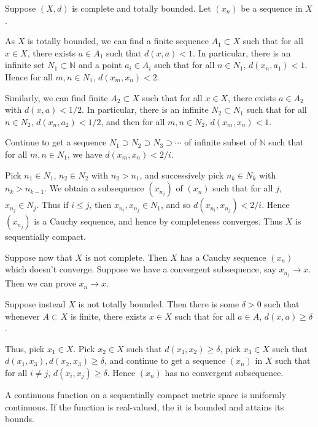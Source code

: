 \documentclass[12pt]{article}
\begin{document}
\begin{proofbox}
	Suppose $(X, d)$ is complete and totally bounded. Let $(x_n)$ be a sequence in $X$.

	As $X$ is totally bounded, we can find a finite sequence $A_1 \subset X$ such that for all $x \in X$, there exists $a \in A_1$ such that $d(x, a) < 1$. In particular, there is an infinite set $N_1 \subset \mathbb{N}$ and a point $a_i \in A_i$ such that for all $n \in N_1$, $d(x_n, a_1) < 1$. Hence for all $m, n \in N_1$, $d(x_m, x_n) < 2$.

	Similarly, we can find finite $A_2 \subset X$ such that for all $x \in X$, there exists $a \in A_2$ with $d(x, a) < 1/2$. In particular, there is an infinite $N_2 \subset N_1$ such that for all $n \in N_2$, $d(x_n, a_2) < 1/2$, and then for all $m, n \in N_2$, $d(x_m, x_n) < 1$.

	Continue to get a sequence $N_1 \supset N_2 \supset N_3 \supset \cdots$ of infinite subset of $\mathbb{N}$ such that for all $m, n \in N_1$, we have $d(x_m, x_n) < 2/i$.
	
	Pick $n_1 \in N_1$, $n_2 \in N_2$ with $n_2 > n_1$, and successively pick $n_k \in N_k$ with $n_k > n_{k-1}$. We obtain a subsequence $(x_{n_j})$ of $(x_n)$ such that for all $j$, $x_{n_j} \in N_j$. Thus if $i \leq j$, then $x_{n_i}, x_{n_j} \in N_1$, and so $d(x_{n_i}, x_{n_j}) < 2/i$. Hence $(x_{n_j})$ is a Cauchy sequence, and hence by completeness converges. Thus $X$ is sequentially compact.

	Suppose now that $X$ is not complete. Then $X$ has a Cauchy sequence $(x_n)$ which doesn't converge. Suppose we have a convergent subsequence, say $x_{n_j}\to x$. Then we can prove $x_n \to x$.

	Suppose instead $X$ is not totally bounded. Then there is some $\delta > 0$ such that whenever $A \subset X$ is finite, there exists $x \in X$ such that for all $a \in A$, $d(x, a) \geq \delta$.

	Thus, pick $x_1 \in X$. Pick $x_2 \in X$ such that $d(x_1, x_2) \geq \delta$, pick $x_3 \in X$ such that $d(x_1, x_3), d(x_2, x_3) \geq \delta$, and continue to get a sequence $(x_n)$ in $X$ such that for all $i \neq j$, $d(x_i, x_j) \geq \delta$. Hence $(x_n)$ has no convergent subsequence.
\end{proofbox}


\begin{corollary}
	A continuous function on a sequentially compact metric space is uniformly continuous. If the function is real-valued, the it is bounded and attains its bounds.
\end{corollary}
\end{document}
